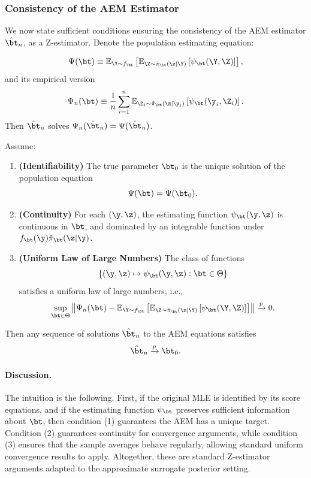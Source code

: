 {\color{red}
\subsubsection{Consistency of the AEM Estimator}

We now state sufficient conditions ensuring the consistency of the AEM estimator $\hat\bt_n$, as a Z-estimator. Denote the population estimating equation:

\begin{equation}
    \Psi(\bt) \equiv 
    \mathbb{E}_{\Y \sim f_\bt}
    \left[
    \mathbb{E}_{\Z \sim \tilde\pi_\bt(\z \mid \Y)}
    \left[
    \psi_\bt(\Y, \Z)
    \right]
    \right],
\end{equation}
%
and its empirical version
%
\begin{equation}
    \Psi_n(\bt) \equiv 
    \frac{1}{n} \sum_{i=1}^n 
    \mathbb{E}_{\Z_i \sim \tilde\pi_\bt(\z \mid \y_i)}
    \left[
    \psi_\bt(\y_i, \Z_i)
    \right].
\end{equation}
%
Then $\hat\bt_n$ solves $\Psi_n(\hat\bt_n) = \Psi(\hat\bt_n)$.

\begin{theorem}
Assume:
\begin{enumerate}
    \item \textbf{(Identifiability)} The true parameter $\bt_0$ is the unique solution of the population equation
    \[
    \Psi(\bt) = \Psi(\bt_0).
    \]
    \item \textbf{(Continuity)} For each $(\y,\z)$, the estimating function $\psi_\bt(\y,\z)$ is continuous in $\bt$, and dominated by an integrable function under $f_\bt(\y)\tilde\pi_\bt(\z|\y)$.
    \item \textbf{(Uniform Law of Large Numbers)} The class of functions
    \[
    \left\{
    (\y,\z) \mapsto \psi_\bt(\y,\z) 
    : \bt \in \Theta
    \right\}
    \]
    satisfies a uniform law of large numbers, i.e.,
    \[
    \sup_{\bt \in \Theta}
    \left\|
    \Psi_n(\bt) - \mathbb{E}_{\Y \sim f_\bt}
    \left[
    \mathbb{E}_{\Z \sim \tilde\pi_\bt(\z \mid \Y)}
    \left[
    \psi_\bt(\Y, \Z)
    \right]
    \right]
    \right\| \xrightarrow{p} 0.
    \]
\end{enumerate}
Then any sequence of solutions $\hat\bt_n$ to the AEM equations satisfies
\[
\hat\bt_n \xrightarrow{p} \bt_0.
\]
\end{theorem}

\paragraph{Discussion.}
The intuition is the following. First, if the original MLE is identified by its score equations, and if the estimating function $\psi_\bt$ preserves sufficient information about $\bt$, then condition (1) guarantees the AEM has a unique target. Condition (2) guarantees continuity for convergence arguments, while condition (3) ensures that the sample averages behave regularly, allowing standard uniform convergence results to apply. Altogether, these are standard Z-estimator arguments adapted to the approximate surrogate posterior setting.

}
